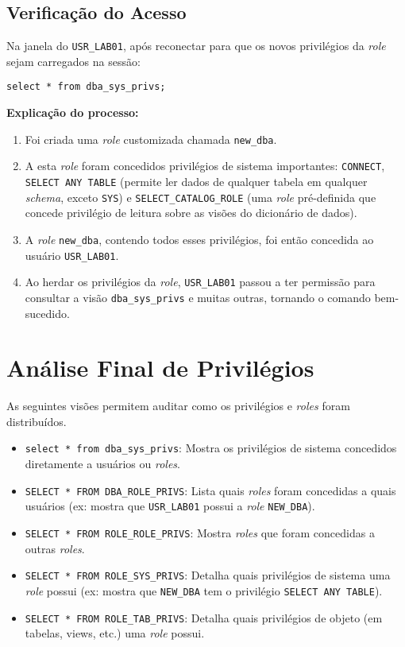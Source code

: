 \documentclass[a4paper, 12pt]{article}
\begin{document}
\subsection{Verificação do Acesso}
Na janela do \texttt{USR\_LAB01}, após reconectar para que os novos privilégios da \textit{role} sejam carregados na sessão:
\begin{lstlisting}
select * from dba_sys_privs;
\end{lstlisting}
\textbf{Explicação do processo:}
\begin{enumerate}
	\item Foi criada uma \textit{role} customizada chamada \texttt{new\_dba}.
	\item A esta \textit{role} foram concedidos privilégios de sistema importantes: \texttt{CONNECT}, \texttt{SELECT ANY TABLE} (permite ler dados de qualquer tabela em qualquer \textit{schema}, exceto \texttt{SYS}) e \texttt{SELECT\_CATALOG\_ROLE} (uma \textit{role} pré-definida que concede privilégio de leitura sobre as visões do dicionário de dados).
	\item A \textit{role} \texttt{new\_dba}, contendo todos esses privilégios, foi então concedida ao usuário \texttt{USR\_LAB01}.
	\item Ao herdar os privilégios da \textit{role}, \texttt{USR\_LAB01} passou a ter permissão para consultar a visão \texttt{dba\_sys\_privs} e muitas outras, tornando o comando bem-sucedido.
\end{enumerate}

\section{Análise Final de Privilégios}
As seguintes visões permitem auditar como os privilégios e \textit{roles} foram distribuídos.

\begin{itemize}
	\item \texttt{select * from dba\_sys\_privs}: Mostra os privilégios de sistema concedidos diretamente a usuários ou \textit{roles}.
	\item \texttt{SELECT * FROM DBA\_ROLE\_PRIVS}: Lista quais \textit{roles} foram concedidas a quais usuários (ex: mostra que \texttt{USR\_LAB01} possui a \textit{role} \texttt{NEW\_DBA}).
	\item \texttt{SELECT * FROM ROLE\_ROLE\_PRIVS}: Mostra \textit{roles} que foram concedidas a outras \textit{roles}.
	\item \texttt{SELECT * FROM ROLE\_SYS\_PRIVS}: Detalha quais privilégios de sistema uma \textit{role} possui (ex: mostra que \texttt{NEW\_DBA} tem o privilégio \texttt{SELECT ANY TABLE}).
	\item \texttt{SELECT * FROM ROLE\_TAB\_PRIVS}: Detalha quais privilégios de objeto (em tabelas, views, etc.) uma \textit{role} possui.
\end{itemize}
\end{document}
